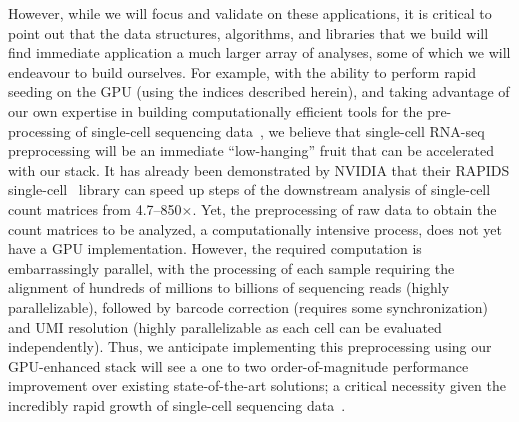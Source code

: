However, while we will focus and validate on these applications, it is critical
to point out that the data structures, algorithms, and libraries that we build
will find immediate application a much larger array of analyses, some of which
we will endeavour to build ourselves. For example, with the ability to perform
rapid seeding on the GPU (using the indices described herein), and taking
advantage of our own expertise in building computationally efficient tools for
the pre-processing of single-cell sequencing data~\cite{he2022alevin}, we
believe that single-cell RNA-seq preprocessing will be an immediate
``low-hanging'' fruit that can be accelerated with our stack. It has already
been demonstrated by NVIDIA that their RAPIDS single-cell~\cite{rapids} library
can speed up steps of the downstream analysis of single-cell count matrices
from 4.7--850$\times$. Yet, the preprocessing of raw data to obtain the count
matrices to be analyzed, a computationally intensive process, does not yet have
a GPU implementation. However, the required computation is embarrassingly
parallel, with the processing of each sample requiring the alignment of
hundreds of millions to billions of sequencing reads (highly parallelizable),
followed by barcode correction (requires some synchronization) and UMI
resolution (highly parallelizable as each cell can be evaluated independently).
Thus, we anticipate implementing this preprocessing using our GPU-enhanced
stack will see a one to two order-of-magnitude performance improvement over
existing state-of-the-art solutions; a critical necessity given the incredibly
rapid growth of single-cell sequencing data~\cite{scgrowth2022}.



